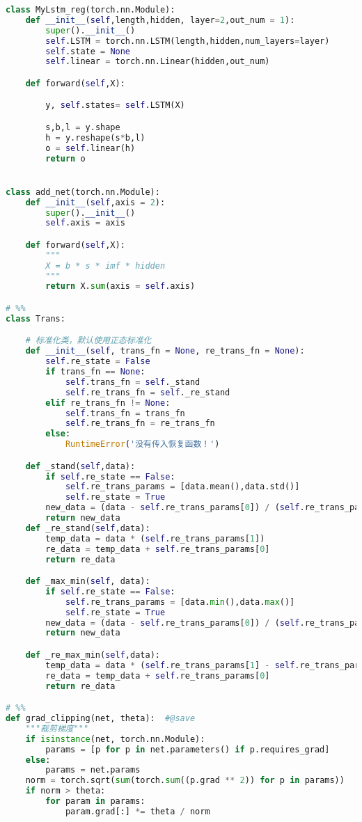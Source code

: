 \begin{appendices}
\begin{lstlisting}[language=python]
class MyLstm_reg(torch.nn.Module):
    def __init__(self,length,hidden, layer=2,out_num = 1):
        super().__init__()
        self.LSTM = torch.nn.LSTM(length,hidden,num_layers=layer)
        self.state = None
        self.linear = torch.nn.Linear(hidden,out_num)

    def forward(self,X):

        y, self.states= self.LSTM(X)

        s,b,l = y.shape
        h = y.reshape(s*b,l)
        o = self.linear(h)
        return o


class add_net(torch.nn.Module):
    def __init__(self,axis = 2):
        super().__init__()
        self.axis = axis

    def forward(self,X):
        """
        X = b * s * imf * hidden
        """
        return X.sum(axis = self.axis)

# %%
class Trans:

    # 标准化类，默认使用正态标准化
    def __init__(self, trans_fn = None, re_trans_fn = None):
        self.re_state = False
        if trans_fn == None:
            self.trans_fn = self._stand
            self.re_trans_fn = self._re_stand
        elif re_trans_fn != None:
            self.trans_fn = trans_fn
            self.re_trans_fn = re_trans_fn
        else:
            RuntimeError('没有传入恢复函数！')

    def _stand(self,data):
        if self.re_state == False:
            self.re_trans_params = [data.mean(),data.std()]
            self.re_state = True
        new_data = (data - self.re_trans_params[0]) / (self.re_trans_params[1])
        return new_data
    def _re_stand(self,data):
        temp_data = data * (self.re_trans_params[1])
        re_data = temp_data + self.re_trans_params[0]
        return re_data

    def _max_min(self, data):
        if self.re_state == False:
            self.re_trans_params = [data.min(),data.max()]
            self.re_state = True
        new_data = (data - self.re_trans_params[0]) / (self.re_trans_params[1] - self.re_trans_params[0])
        return new_data

    def _re_max_min(self,data):
        temp_data = data * (self.re_trans_params[1] - self.re_trans_params[0])
        re_data = temp_data + self.re_trans_params[0]
        return re_data

# %%
def grad_clipping(net, theta):  #@save
    """裁剪梯度"""
    if isinstance(net, torch.nn.Module):
        params = [p for p in net.parameters() if p.requires_grad]
    else:
        params = net.params
    norm = torch.sqrt(sum(torch.sum((p.grad ** 2)) for p in params))
    if norm > theta:
        for param in params:
            param.grad[:] *= theta / norm


\end{lstlisting}
\end{appendices}
